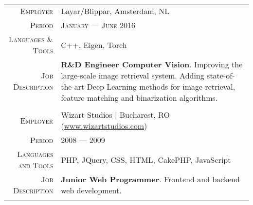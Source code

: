 \documentclass[a4paper, oneside, final]{scrartcl}
\newcommand{\gray}{\rowcolor[gray]{.90}}
\begin{document}
\begin{center}
\begin{tabular}{r@{\hskip 0.3in}p{11.3cm}}
			\gray \textsc{Employer}     & Layar\slash Blippar, Amsterdam, NL\\
			\textsc{Period}             & \textsc{January --- June 2016} \\
			\textsc{Languages \& Tools} & C++, Eigen, Torch\\
			\textsc{Job Description}    & \textbf{R\&D Engineer Computer Vision}. 
				Improving the large-scale image retrieval system. 
				Adding state-of-the-art Deep Learning methods for image retrieval, 
				feature matching and binarization algorithms.\\
			\multicolumn{2}{c}{}\\ %

			\gray \textsc{Employer}      & Wizart Studios $\mid$ Bucharest, RO 
				\small{(\href{http://www.wizartstudios.com}{www.wizartstudios.com})}\\
			\textsc{Period}              & \textsc{2008 --- 2009} \\
			\textsc{Languages and Tools} & PHP, JQuery, CSS, HTML, CakePHP, JavaScript\\ 
			\textsc{Job Description}     & \textbf{Junior Web Programmer}. Frontend and backend web 
				development.\\ 
			\multicolumn{2}{c}{}\\
		\end{tabular}


\end{center}
\end{document}
